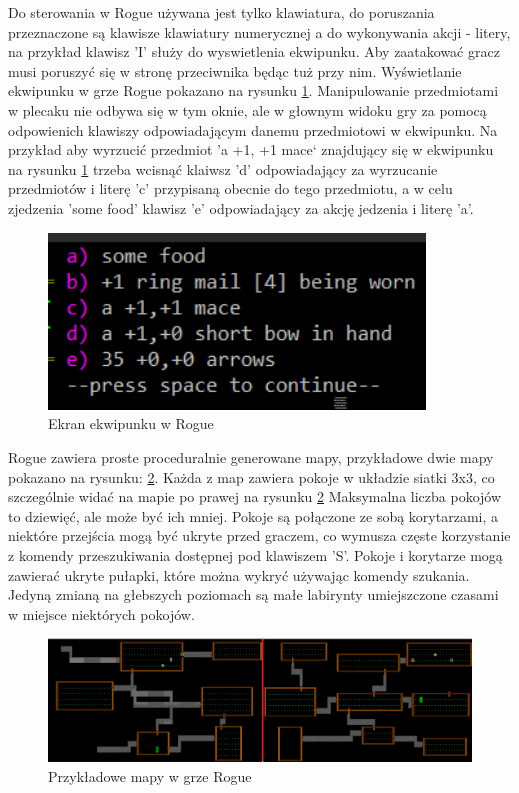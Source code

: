 \documentclass[12pt,twoside]{article}
\begin{document}
Do sterowania w Rogue używana jest tylko klawiatura, do poruszania przeznaczone są klawisze klawiatury numerycznej a do wykonywania akcji -  litery, na przykład klawisz 'I' służy do wyswietlenia ekwipunku. Aby zaatakować gracz musi poruszyć się w stronę przeciwnika będąc tuż przy nim. Wyświetlanie ekwipunku w grze Rogue pokazano na rysunku \ref{Rogue:scr2}. Manipulowanie przedmiotami w plecaku nie odbywa się w tym oknie, ale w głownym widoku gry za pomocą odpowienich klawiszy odpowiadającym danemu przedmiotowi w ekwipunku. Na przykład aby wyrzucić przedmiot 'a +1, +1 mace` znajdujący się w ekwipunku na rysunku \ref{Rogue:scr2} trzeba wcisnąć klaiwsz 'd' odpowiadający za wyrzucanie przedmiotów i literę 'c' przypisaną obecnie do tego przedmiotu, a w celu zjedzenia 'some food' klawisz 'e' odpowiadający za akcję jedzenia i literę 'a'. 

\FloatBarrier
\begin{figure}[h]
	\centering
	\includegraphics[width=10cm]{images/rogue/scr2.png}
	\caption{Ekran ekwipunku w Rogue}
	\label{Rogue:scr2}
\end{figure}
\FloatBarrier

Rogue zawiera proste proceduralnie generowane mapy, przykładowe dwie mapy pokazano na rysunku: \ref{Rogue:scr3}. Każda z map zawiera pokoje w układzie siatki 3x3, co szczególnie widać na mapie po prawej na rysunku \ref{Rogue:scr3} Maksymalna liczba pokojów to dziewięć, ale może być ich mniej. Pokoje są połączone ze sobą korytarzami, a niektóre przejścia mogą być ukryte przed graczem, co wymusza częste korzystanie z komendy przeszukiwania dostępnej pod klawiszem 'S'. Pokoje i korytarze mogą zawierać ukryte pułapki, które można wykryć używając komendy szukania. Jedyną zmianą na głebszych poziomach są małe labirynty umiejszczone czasami w miejsce niektórych pokojów.

\FloatBarrier
\begin{figure}[h]
	\centering
	\includegraphics[width=16cm]{images/rogue/scr3.png}
	\caption{Przykładowe mapy w grze Rogue}
	\label{Rogue:scr3}
\end{figure}
\FloatBarrier
\end{document}
